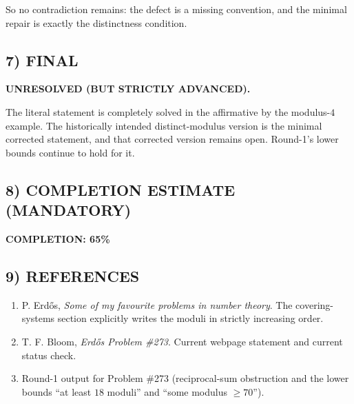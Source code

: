 So no contradiction remains: the defect is a missing convention, and the minimal repair is exactly the distinctness condition.

\subsection*{7) FINAL}

\textbf{UNRESOLVED (BUT STRICTLY ADVANCED).}

The literal statement is completely solved in the affirmative by the modulus-$4$ example.  The historically intended distinct-modulus version is the minimal corrected statement, and that corrected version remains open.  Round-1's lower bounds continue to hold for it.

\subsection*{8) COMPLETION ESTIMATE (MANDATORY)}

\textbf{COMPLETION: 65\%}

\subsection*{9) REFERENCES}

\begin{enumerate}
\item P. Erd\H{o}s, \emph{Some of my favourite problems in number theory}.  The covering-systems section explicitly writes the moduli in strictly increasing order.
\item T. F. Bloom, \emph{Erd\H{o}s Problem \#273}.  Current webpage statement and current status check.
\item Round-1 output for Problem \#273 (reciprocal-sum obstruction and the lower bounds ``at least $18$ moduli'' and ``some modulus $\ge 70$'').
\end{enumerate}



